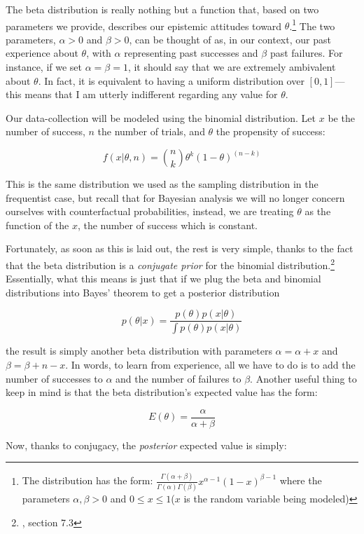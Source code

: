 The beta distribution is really nothing but a function that, based on
two parameters we provide, describes our epistemic attitudes toward
\(\theta\).\footnote{The distribution has the form:
  \(\frac{\Gamma(\alpha + \beta)}{\Gamma(\alpha)\Gamma(\beta)}x^{\alpha -1} (1-x)^{\beta -1}\)
  where the parameters \(\alpha,\beta > 0\) and
  \(0\leq x \leq 1\)(\(x\) is the random variable being
  modeled) } The two parameters, \(\alpha>0\) and \(\beta>0\), can be
thought of as, in our context, our past experience about \(\theta\),
with \(\alpha\) representing past successes and \(\beta\) past failures.
For instance, if we set \(\alpha = \beta = 1\), it should say that we
are extremely ambivalent about \(\theta\). In fact, it is equivalent to
having a uniform distribution over \([0,1]\)---this means that I am
utterly indifferent regarding any value for \(\theta\).

Our data-collection will be modeled using the binomial distribution. Let
\(x\) be the number of success, \(n\) the number of trials, and
\(\theta\) the propensity of success:

\[f(x|\theta, n) = {n\choose k} \theta^k (1-\theta)^{(n-k)}\]

This is the same distribution we used as the sampling distribution in
the frequentist case, but recall that for Bayesian analysis we will no
longer concern ourselves with counterfactual probabilities, instead, we
are treating \(\theta\) as the function of the \(x\), the number of
success which is constant.

Fortunately, as soon as this is laid out, the rest is very simple,
thanks to the fact that the beta distribution is a \emph{conjugate
prior} for the binomial distribution.\footnote{\cite{degroot}, section 7.3} Essentially, what this means is
just that if we plug the beta and binomial distributions into Bayes'
theorem to get a posterior distribution

\[ p(\theta|x) = \frac{p(\theta)p(x|\theta)}{\int p(\theta)p(x|\theta)}\]

\noindent the result is simply another beta distribution with parameters
\(\alpha =\alpha + x\) and \(\beta = \beta + n - x\). In words, to learn
from experience, all we have to do is to add the number of successes to
\(\alpha\) and the number of failures to \(\beta\). Another useful thing
to keep in mind is that the beta distribution's expected value has the
form:

\[E(\theta) = \frac{\alpha}{\alpha + \beta}\]

\noindent Now, thanks to conjugacy, the \emph{posterior} expected value
is simply:

